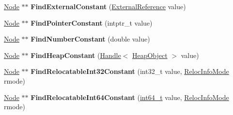 \begin{DoxyCompactItemize}
\item 
\mbox{\label{classv8_1_1internal_1_1compiler_1_1CommonNodeCache_a8aaf07b751ea60fc30e506d326d52728}} 
\mbox{\hyperlink{classv8_1_1internal_1_1compiler_1_1Node}{Node}} $\ast$$\ast$ {\bfseries Find\+External\+Constant} (\mbox{\hyperlink{classv8_1_1internal_1_1ExternalReference}{External\+Reference}} value)
\item 
\mbox{\label{classv8_1_1internal_1_1compiler_1_1CommonNodeCache_ae7163bccdbe463ebbbd6caa0ffdfe3a4}} 
\mbox{\hyperlink{classv8_1_1internal_1_1compiler_1_1Node}{Node}} $\ast$$\ast$ {\bfseries Find\+Pointer\+Constant} (intptr\+\_\+t value)
\item 
\mbox{\label{classv8_1_1internal_1_1compiler_1_1CommonNodeCache_af1d30f8d75aa98f87ba6fb7c34bf5f2b}} 
\mbox{\hyperlink{classv8_1_1internal_1_1compiler_1_1Node}{Node}} $\ast$$\ast$ {\bfseries Find\+Number\+Constant} (double value)
\item 
\mbox{\label{classv8_1_1internal_1_1compiler_1_1CommonNodeCache_aed0364b7c925b241036ee1478fb0aa7d}} 
\mbox{\hyperlink{classv8_1_1internal_1_1compiler_1_1Node}{Node}} $\ast$$\ast$ {\bfseries Find\+Heap\+Constant} (\mbox{\hyperlink{classv8_1_1internal_1_1Handle}{Handle}}$<$ \mbox{\hyperlink{classv8_1_1internal_1_1HeapObject}{Heap\+Object}} $>$ value)
\item 
\mbox{\label{classv8_1_1internal_1_1compiler_1_1CommonNodeCache_abeaa2f8f117209ff9b19d0b2a83294e3}} 
\mbox{\hyperlink{classv8_1_1internal_1_1compiler_1_1Node}{Node}} $\ast$$\ast$ {\bfseries Find\+Relocatable\+Int32\+Constant} (int32\+\_\+t value, \mbox{\hyperlink{classchar}{Reloc\+Info\+Mode}} rmode)
\item 
\mbox{\label{classv8_1_1internal_1_1compiler_1_1CommonNodeCache_aaff5443e2864ab3e31b47fe3d7d7982e}} 
\mbox{\hyperlink{classv8_1_1internal_1_1compiler_1_1Node}{Node}} $\ast$$\ast$ {\bfseries Find\+Relocatable\+Int64\+Constant} (\mbox{\hyperlink{classint64__t}{int64\+\_\+t}} value, \mbox{\hyperlink{classchar}{Reloc\+Info\+Mode}} rmode)

\end{DoxyCompactItemize}
